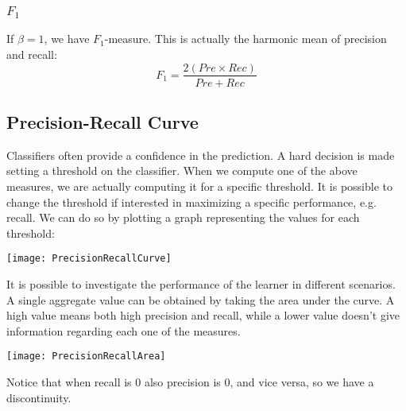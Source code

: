 \subsubsection{$F_1$}
If $\beta=1$, we have $F_1$-measure. This is actually the harmonic mean of precision and recall:
\[F_1=\frac{2(Pre\times Rec)}{Pre+Rec}\]
%
%
\subsection{Precision-Recall Curve}
Classifiers often provide a confidence in the prediction. A hard decision is made setting a threshold on the classifier. When we compute one of the above measures, we are actually computing it for a specific threshold. It is possible to change the threshold if interested in maximizing a specific performance, e.g. recall. \newline
We can do so by plotting a graph representing the values for each threshold:
\begin{center}
  \texttt{[image: PrecisionRecallCurve]}
\end{center}
It is possible to investigate the performance of the learner in different scenarios. \newline
A single aggregate value can be obtained by taking the area under the curve. A high value means both high precision and recall, while a lower value doesn't give information regarding each one of the measures.
\begin{center}
  \texttt{[image: PrecisionRecallArea]}
\end{center}
Notice that when recall is 0 also precision is 0, and vice versa, so we have a discontinuity. 
%
%
%
